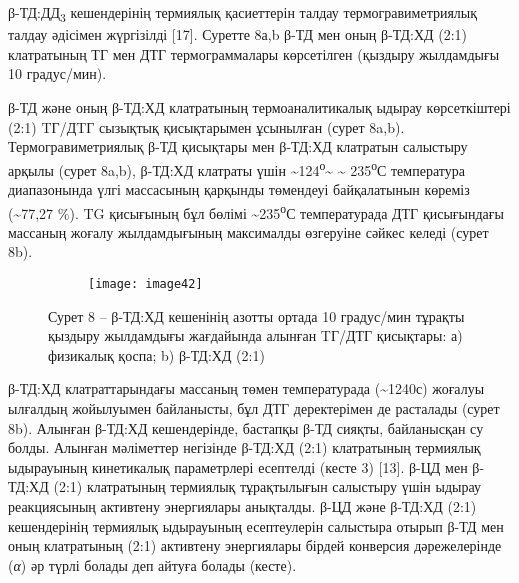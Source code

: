 \begin{multicols}{2}
β-ТД:ДД\textsubscript{3} кешендерінің термиялық қасиеттерін талдау
термогравиметриялық талдау әдісімен жүргізілді {[}17{]}. Суретте 8а,b
β-ТД мен оның β-ТД:ХД (2:1) клатратының ТГ мен ДТГ термограммалары
көрсетілген (қыздыру жылдамдығы 10 градус/мин).

β-ТД және оның β-ТД:ХД клатратының термоаналитикалық ыдырау
көрсеткіштері (2:1) TГ/ДTГ сызықтық қисықтарымен ұсынылған (сурет 8a,b).
Термогравиметриялық β-ТД қисықтары мен β-ТД:ХД клатратын салыстыру
арқылы (сурет 8a,b), β-ТД:ХД клатраты үшін
\textasciitilde124\textsuperscript{о}\textasciitilde{} \textasciitilde{}
235\textsuperscript{о}С температура диапазонында үлгі массасының
қарқынды төмендеуі байқалатынын көреміз (\textasciitilde77,27 \%). TG
қисығының бұл бөлімі \textasciitilde235\textsuperscript{о}С
температурада ДТГ қисығындағы массаның жоғалу жылдамдығының максималды
өзгеруіне сәйкес келеді (сурет 8b).
\end{multicols}

\begin{figure}[H]
\centering
\begin{subfigure}[b]{0.8\textwidth}
\centering
\texttt{[image: image42]}
\end{subfigure}
\caption*{Сурет 8 -- β-ТД:ХД кешенінің азотты ортада 10 градус/мин тұрақты қыздыру
жылдамдығы жағдайында алынған TГ/ДТГ қисықтары: а) физикалық қоспа; b)
β-ТД:ХД (2:1)}
\end{figure}


\begin{multicols}{2}
β-ТД:ХД клатраттарындағы массаның төмен температурада
(\textasciitilde1240с) жоғалуы ылғалдың жойылуымен байланысты, бұл ДТГ
деректерімен де расталады (сурет 8b). Алынған β-ТД:ХД кешендерінде,
бастапқы β-ТД сияқты, байланысқан су болды. Алынған мәліметтер негізінде
β-ТД:ХД (2:1) клатратының термиялық ыдырауының кинетикалық параметрлері
есептелді (кесте 3) {[}13{]}. β-ЦД мен β-ТД:ХД (2:1) клатратының
термиялық тұрақтылығын салыстыру үшін ыдырау реакциясының активтену
энергиялары анықталды. β-ЦД және β-ТД:ХД (2:1) кешендерінің термиялық
ыдырауының есептеулерін салыстыра отырып β-ТД мен оның клатратының (2:1)
активтену энергиялары бірдей конверсия дәрежелерінде (\emph{α}) әр түрлі
болады деп айтуға болады (кесте).
\end{multicols}

